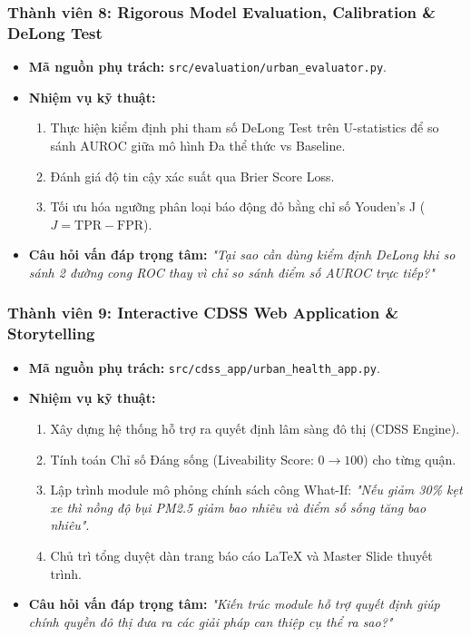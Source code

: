 \documentclass[12pt,a4paper]{article}
\begin{document}
\subsubsection{Thành viên 8: Rigorous Model Evaluation, Calibration \& DeLong Test}
\begin{itemize}
    \item \textbf{Mã nguồn phụ trách:} \texttt{src/evaluation/urban\_evaluator.py}.
    \item \textbf{Nhiệm vụ kỹ thuật:}
    \begin{enumerate}
        \item Thực hiện kiểm định phi tham số DeLong Test trên U-statistics để so sánh AUROC giữa mô hình Đa thể thức vs Baseline.
        \item Đánh giá độ tin cậy xác suất qua Brier Score Loss.
        \item Tối ưu hóa ngưỡng phân loại báo động đỏ bằng chỉ số Youden's J ($J = \text{TPR} - \text{FPR}$).
    \end{enumerate}
    \item \textbf{Câu hỏi vấn đáp trọng tâm:} \textit{"Tại sao cần dùng kiểm định DeLong khi so sánh 2 đường cong ROC thay vì chỉ so sánh điểm số AUROC trực tiếp?"}
\end{itemize}

\subsubsection{Thành viên 9: Interactive CDSS Web Application \& Storytelling}
\begin{itemize}
    \item \textbf{Mã nguồn phụ trách:} \texttt{src/cdss\_app/urban\_health\_app.py}.
    \item \textbf{Nhiệm vụ kỹ thuật:}
    \begin{enumerate}
        \item Xây dựng hệ thống hỗ trợ ra quyết định lâm sàng đô thị (CDSS Engine).
        \item Tính toán Chỉ số Đáng sống (Liveability Score: $0 \to 100$) cho từng quận.
        \item Lập trình module mô phỏng chính sách công What-If: \textit{"Nếu giảm 30\% kẹt xe thì nồng độ bụi PM2.5 giảm bao nhiêu và điểm số sống tăng bao nhiêu"}.
        \item Chủ trì tổng duyệt dàn trang báo cáo LaTeX và Master Slide thuyết trình.
    \end{enumerate}
    \item \textbf{Câu hỏi vấn đáp trọng tâm:} \textit{"Kiến trúc module hỗ trợ quyết định giúp chính quyền đô thị đưa ra các giải pháp can thiệp cụ thể ra sao?"}
\end{itemize}
\end{document}
